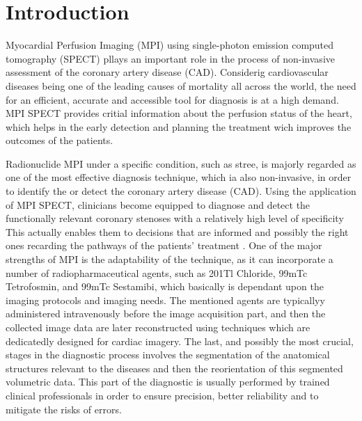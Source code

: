 \chapter{Introduction}
\label{ch:intro}

Myocardial Perfusion Imaging (MPI) using single-photon emission computed tomography (SPECT) pllays an important role in the process of non-invasive assessment of the coronary artery disease (CAD). Considerig cardiovascular diseases being one of the leading causes of mortality all across the world, the need for an efficient, accurate and accessible tool for diagnosis is at a high demand. MPI SPECT provides critial information about the perfusion status of the heart, which helps in the early detection and planning the treatment wich improves the outcomes of the patients.

Radionuclide MPI under a specific condition, such as stree, is majorly regarded as one of the most effective diagnosis technique, which ia also non-invasive, in order to identify the or detect the coronary artery disease (CAD). Using the application of MPI SPECT, clinicians become equipped to diagnose and detect the functionally relevant coronary stenoses with a relatively high level of specificity This actually enables them to decisions that are informed and possibly the right ones recarding the pathways of the patients' treatment \cite{10.1001/jamacardio.2017.2471}. One of the major strengths of MPI is the adaptability of the technique, as it can incorporate a number of radiopharmaceutical agents, such as 201Tl Chloride, 99mTc Tetrofosmin, and 99mTc Sestamibi, which basically is dependant upon the imaging protocols and imaging needs. The mentioned agents are typicallyy administered intravenously before the image acquisition part, and then the collected image data are later reconstructed using techniques which are dedicatedly designed for cardiac imagery. The last, and possibly the most crucial, stages in the diagnostic process involves the segmentation of the anatomical structures relevant to the diseases and then the reorientation of this segmented volumetric data. This part of the diagnostic is usually performed by trained clinical professionals in order to ensure precision, better reliability and to mitigate the risks of errors.

